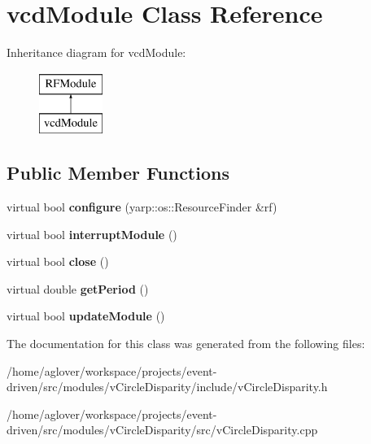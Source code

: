 \hypertarget{classvcdModule}{}\section{vcd\+Module Class Reference}
\label{classvcdModule}
Inheritance diagram for vcd\+Module\+:\begin{figure}[H]
\begin{center}
\leavevmode
\includegraphics[height=2.000000cm]{classvcdModule}
\end{center}
\end{figure}
\subsection*{Public Member Functions}
\begin{DoxyCompactItemize}
\item 
virtual bool {\bfseries configure} (yarp\+::os\+::\+Resource\+Finder \&rf)\hypertarget{classvcdModule_a72f6523b85d300a2a8aceb82501e05f7}{}\label{classvcdModule_a72f6523b85d300a2a8aceb82501e05f7}

\item 
virtual bool {\bfseries interrupt\+Module} ()\hypertarget{classvcdModule_a73bd29efc30b548bc4935b2d56089fd3}{}\label{classvcdModule_a73bd29efc30b548bc4935b2d56089fd3}

\item 
virtual bool {\bfseries close} ()\hypertarget{classvcdModule_ad92e877a36ac7e9548bf7dcad67575ae}{}\label{classvcdModule_ad92e877a36ac7e9548bf7dcad67575ae}

\item 
virtual double {\bfseries get\+Period} ()\hypertarget{classvcdModule_ac8c7b1f48ecd3022cd7b19fe1d9466e6}{}\label{classvcdModule_ac8c7b1f48ecd3022cd7b19fe1d9466e6}

\item 
virtual bool {\bfseries update\+Module} ()\hypertarget{classvcdModule_a493580c216623260104f0e13749031b0}{}\label{classvcdModule_a493580c216623260104f0e13749031b0}

\end{DoxyCompactItemize}


The documentation for this class was generated from the following files\+:\begin{DoxyCompactItemize}
\item 
/home/aglover/workspace/projects/event-\/driven/src/modules/v\+Circle\+Disparity/include/v\+Circle\+Disparity.\+h\item 
/home/aglover/workspace/projects/event-\/driven/src/modules/v\+Circle\+Disparity/src/v\+Circle\+Disparity.\+cpp\end{DoxyCompactItemize}
